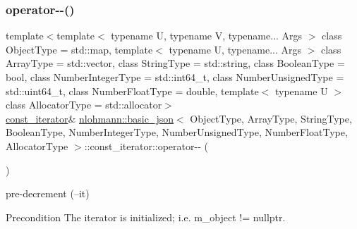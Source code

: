 \subsubsection{\texorpdfstring{operator-\/-\/()}{operator--()}\hspace{0.1cm}{\footnotesize\ttfamily [2/2]}}
{\footnotesize\ttfamily template$<$template$<$ typename U, typename V, typename... Args $>$ class Object\+Type = std\+::map, template$<$ typename U, typename... Args $>$ class Array\+Type = std\+::vector, class String\+Type  = std\+::string, class Boolean\+Type  = bool, class Number\+Integer\+Type  = std\+::int64\+\_\+t, class Number\+Unsigned\+Type  = std\+::uint64\+\_\+t, class Number\+Float\+Type  = double, template$<$ typename U $>$ class Allocator\+Type = std\+::allocator$>$ \\
\hyperlink{classnlohmann_1_1basic__json_1_1const__iterator}{const\+\_\+iterator}\& \hyperlink{classnlohmann_1_1basic__json}{nlohmann\+::basic\+\_\+json}$<$ Object\+Type, Array\+Type, String\+Type, Boolean\+Type, Number\+Integer\+Type, Number\+Unsigned\+Type, Number\+Float\+Type, Allocator\+Type $>$\+::const\+\_\+iterator\+::operator-\/-\/ (\begin{DoxyParamCaption}{ }\end{DoxyParamCaption})\hspace{0.3cm}{\ttfamily [inline]}}



pre-\/decrement (--it) 

\begin{DoxyPrecond}{Precondition}
The iterator is initialized; i.\+e. {\ttfamily m\+\_\+object != nullptr}. 
\end{DoxyPrecond}
\mbox{\label{classnlohmann_1_1basic__json_1_1const__iterator_aefac8f3e390ac917f021761f4a8f8e71}} 
